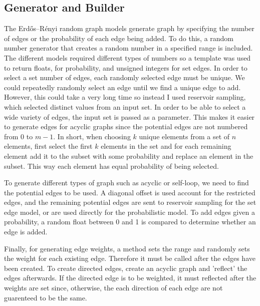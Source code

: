 \documentclass{article}
\begin{document}
\subsection{Generator and Builder}
The Erdős–Rényi random graph models generate graph by specifying the number of edges or the probability of each edge being added. To do this, a random number generator that creates a random number in a specified range is included. The different models required different types of numbers so a template was used to return floats, for probability, and unsigned integers for set edges. In order to select a set number of edges, each randomly selected edge must be unique. We could repeatedly randomly select an edge until we find a unique edge to add. However, this could take a very long time so instead I used reservoir sampling, which selected distinct values from an input set. In order to be able to select a wide variety of edges, the input set is passed as a parameter. This makes it easier to generate edges for acyclic graphs since the potential edges are not numbered from 0 to $m-1$. In short, when choosing $k$ unique elements from a set of $n$ elements, first select the first $k$ elements in the set and for each remaining element add it to the subset with some probability and replace an element in the subset. This way each element has equal probability of being selected. 

To generate different types of graph such as acyclic or self-loop, we need to find the potential edges to be used. A diagonal offset is used account for the restricted edges, and the remaining potential edges are sent to reservoir sampling for the set edge model, or are used directly for the probabilistic model. To add edges given a probability, a random float between 0 and 1 is compared to determine whether an edge is added. 

Finally, for generating edge weights, a method sets the range and randomly sets the weight for each existing edge. Therefore it must be called after the edges have been created. To create directed edges, create an acyclic graph and 'reflect' the edges afterwards. If the directed edge is to be weighted, it must reflected after the weights are set since, otherwise, the each direction of each edge are not guarenteed to be the same.
\end{document}

